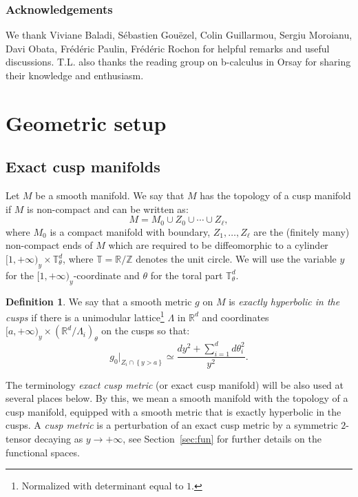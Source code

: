 \documentclass[JEP,XML,SOM,Unicode,NoFloatCountersInSection]{cedram}
\newcommand{\R}{\mathbb{R}}
\newcommand{\T}{\mathbb{T}}
\newcommand{\Z}{\mathbb{Z}}
\theoremstyle{plain}
\theoremstyle{definition}
\newtheorem{definition}{Definition}[section]
\begin{document}
\subsubsection*{Acknowledgements}
We thank Viviane Baladi, Sébastien Gouëzel, Colin Guillarmou, Sergiu Moroianu, Davi Obata, Frédéric Paulin, Frédéric Rochon for helpful \hbox{remarks} and useful discussions. T.L. also thanks the reading group on b-calculus in Orsay for sharing their knowledge and enthusiasm.

\section{Geometric setup}
\label{sec:geom-in-cusps}

\subsection{Exact cusp manifolds}

\label{ssection:cusp}

Let $M$ be a smooth manifold. We say that $M$ has the topology of a cusp manifold if $M$ is non-compact and can be written as:
\[
M = M_0 \cup Z_0 \cup \cdots \cup Z_\ell,
\]
where $M_0$ is a compact manifold with boundary, $Z_1,\dots, Z_\ell$ are the (finitely many) non-compact ends of $M$ which are required to be diffeomorphic to a cylinder $[1,+\infty)_y \times \T^d_\theta$, where $\T=\R/\Z$ denotes the unit circle. We will use the variable $y$ for the $[1,+\infty)_y$-coordinate and $\theta$ for the toral part $\T^d_\theta$.

\begin{definition}
\label{definition:hyperbolic}
We say that a smooth metric $g$ on $M$ is \emph{exactly hyperbolic in the cusps} if there is a unimodular lattice\footnote{Normalized with determinant equal to $1$.} $\Lambda$ in $\R^d$ and coordinates $[a,+\infty)_y \times (\R^d/\Lambda_i)_\theta$ on the cusps so that:\vspace*{-3pt}
\[
g_0|_{Z_i \cap \left\{y > a \right\}} \simeq \dfrac{dy^2+ \sum_{i=1}^d d\theta_i^2}{y^2}.
\]
\end{definition}

The terminology \emph{exact cusp metric} (or exact cusp manifold) will be also used at several places below. By this, we mean a smooth manifold with the topology of a cusp manifold, equipped with a smooth metric that is exactly hyperbolic in the cusps. A \emph{cusp metric} is a perturbation of an exact cusp metric by a symmetric $2$-tensor decaying as $y \to +\infty$, see Section~\ref{sec:fun} for further details on the functional spaces.
\end{document}
